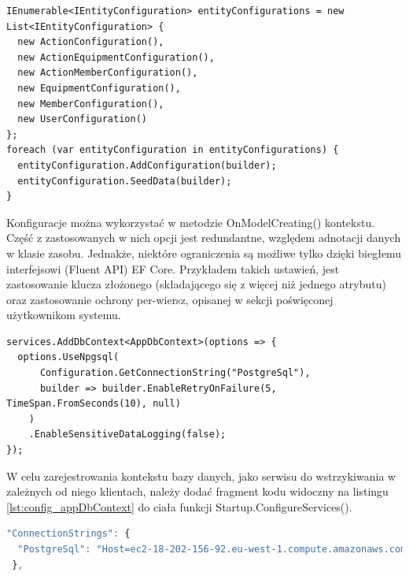 \begin{lstlisting}[language=CSharp, caption=Fragment metody AppDbContext.OnModelCreating() poświęcony klasom konfiguracyjnym encji, label=lst:onModelCreating_configs]
IEnumerable<IEntityConfiguration> entityConfigurations = new List<IEntityConfiguration> {
  new ActionConfiguration(),
  new ActionEquipmentConfiguration(),
  new ActionMemberConfiguration(),
  new EquipmentConfiguration(),
  new MemberConfiguration(),
  new UserConfiguration()
};
foreach (var entityConfiguration in entityConfigurations) {
  entityConfiguration.AddConfiguration(builder);
  entityConfiguration.SeedData(builder);
}
\end{lstlisting}

Konfiguracje można wykorzystać w metodzie OnModelCreating() kontekstu. Część z zastosowanych w nich opcji jest redundantne, względem adnotacji danych w klasie zasobu. Jednakże, niektóre ograniczenia są możliwe tylko dzięki biegłemu interfejsowi (Fluent API) EF Core. Przykładem takich ustawień, jest zastosowanie klucza złożonego (składającego się z więcej niż jednego atrybutu) oraz zastosowanie ochrony per-wiersz, opisanej w sekcji poświęconej użytkownikom systemu.

\begin{lstlisting}[language=CSharp, caption=Rejestracja kontekstu bazy danych jako serwis w metodzie Startup.ConfigureServices(), label=lst:config_appDbContext]
services.AddDbContext<AppDbContext>(options => {
  options.UseNpgsql(
      Configuration.GetConnectionString("PostgreSql"),
      builder => builder.EnableRetryOnFailure(5, TimeSpan.FromSeconds(10), null)
    )
    .EnableSensitiveDataLogging(false);
});
\end{lstlisting}

W celu zarejestrowania kontekstu bazy danych, jako serwisu do wstrzykiwania w zależnych od niego klientach, należy dodać fragment kodu widoczny na listingu \ref{lst:config_appDbContext} do ciała funkcji Startup.ConfigureServices(). 

\begin{lstlisting}[language=JavaScript, caption=Fragment pliku konfiguracyjnego appsettings.json zawierający łańcuch połączenia z bazą danych, label=lst:appsettings_conStr]
"ConnectionStrings": {
  "PostgreSql": "Host=ec2-18-202-156-92.eu-west-1.compute.amazonaws.com;Port=5432;Database=d92n4e7hua6lht;Username=lundqzkmrjkhry;Password=1e089e898b0ee3a9a3863e3be4921f37ed691a8a40dc2c02d876c382934d29c8"
 },
\end{lstlisting}

